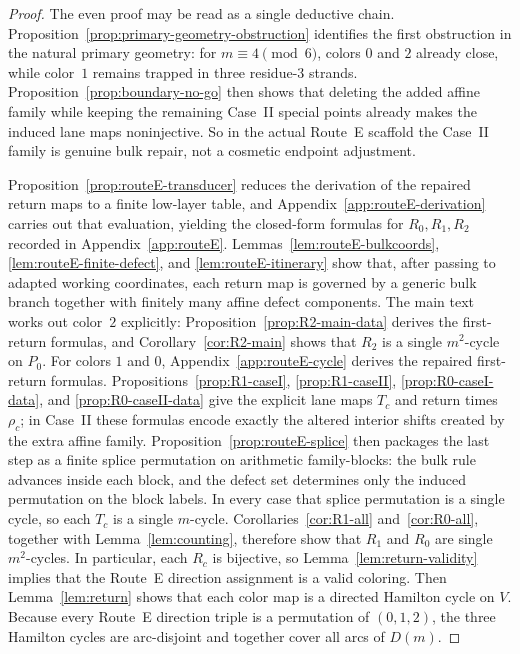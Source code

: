 \documentclass[11pt]{article}
\begin{document}
\begin{proof}
The even proof may be read as a single deductive chain.
Proposition~\ref{prop:primary-geometry-obstruction} identifies the first obstruction in the natural primary geometry: for $m\equiv 4\pmod 6$, colors $0$ and $2$ already close, while color~$1$ remains trapped in three residue-$3$ strands.
Proposition~\ref{prop:boundary-no-go} then shows that deleting the added affine family while keeping the remaining Case~II special points already makes the induced lane maps noninjective.
So in the actual Route~E scaffold the Case~II family is genuine bulk repair, not a cosmetic endpoint adjustment.

Proposition~\ref{prop:routeE-transducer} reduces the derivation of the repaired return maps to a finite low-layer table, and Appendix~\ref{app:routeE-derivation} carries out that evaluation, yielding the closed-form formulas for $R_0,R_1,R_2$ recorded in Appendix~\ref{app:routeE}.
Lemmas~\ref{lem:routeE-bulkcoords}, \ref{lem:routeE-finite-defect}, and \ref{lem:routeE-itinerary} show that, after passing to adapted working coordinates, each return map is governed by a generic bulk branch together with finitely many affine defect components.
The main text works out color~$2$ explicitly: Proposition~\ref{prop:R2-main-data} derives the first-return formulas, and Corollary~\ref{cor:R2-main} shows that $R_2$ is a single $m^2$-cycle on $P_0$.
For colors $1$ and $0$, Appendix~\ref{app:routeE-cycle} derives the repaired first-return formulas.
Propositions~\ref{prop:R1-caseI}, \ref{prop:R1-caseII}, \ref{prop:R0-caseI-data}, and \ref{prop:R0-caseII-data} give the explicit lane maps $T_c$ and return times $\rho_c$; in Case~II these formulas encode exactly the altered interior shifts created by the extra affine family.
Proposition~\ref{prop:routeE-splice} then packages the last step as a finite splice permutation on arithmetic family-blocks: the bulk rule advances inside each block, and the defect set determines only the induced permutation on the block labels.
In every case that splice permutation is a single cycle, so each $T_c$ is a single $m$-cycle.
Corollaries~\ref{cor:R1-all} and~\ref{cor:R0-all}, together with Lemma~\ref{lem:counting}, therefore show that $R_1$ and $R_0$ are single $m^2$-cycles.
In particular, each $R_c$ is bijective, so Lemma~\ref{lem:return-validity} implies that the Route~E direction assignment is a valid coloring.
Then Lemma~\ref{lem:return} shows that each color map is a directed Hamilton cycle on $V$.
Because every Route~E direction triple is a permutation of $(0,1,2)$, the three Hamilton cycles are arc-disjoint and together cover all arcs of $D(m)$.
\end{proof}
\end{document}

